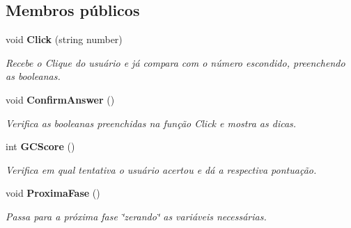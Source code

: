 \subsection*{Membros públicos}
\begin{DoxyCompactItemize}
\item 
void \textbf{ Click} (string number)
\begin{DoxyCompactList}\small\item\em Recebe o Clique do usuário e já compara com o número escondido, preenchendo as booleanas. \end{DoxyCompactList}\item 
void \textbf{ Confirm\+Answer} ()
\begin{DoxyCompactList}\small\item\em Verifica as booleanas preenchidas na função \textquotesingle{}Click\textquotesingle{} e mostra as dicas. \end{DoxyCompactList}\item 
int \textbf{ G\+C\+Score} ()
\begin{DoxyCompactList}\small\item\em Verifica em qual tentativa o usuário acertou e dá a respectiva pontuação. \end{DoxyCompactList}\item 
void \textbf{ Proxima\+Fase} ()
\begin{DoxyCompactList}\small\item\em Passa para a próxima fase \char`\"{}zerando\char`\"{} as variáveis necessárias. \end{DoxyCompactList}\end{DoxyCompactItemize}
